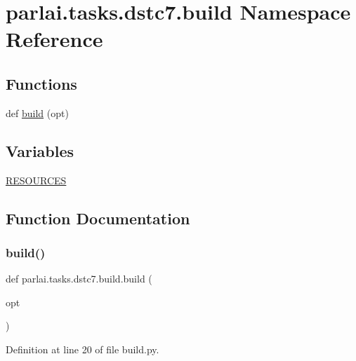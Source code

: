 \hypertarget{namespaceparlai_1_1tasks_1_1dstc7_1_1build}{}\section{parlai.\+tasks.\+dstc7.\+build Namespace Reference}
\label{namespaceparlai_1_1tasks_1_1dstc7_1_1build}
\subsection*{Functions}
\begin{DoxyCompactItemize}
\item 
def \hyperlink{namespaceparlai_1_1tasks_1_1dstc7_1_1build_a98e07e2cecdc25019b4d5eea7ea56e49}{build} (opt)
\end{DoxyCompactItemize}
\subsection*{Variables}
\begin{DoxyCompactItemize}
\item 
\hyperlink{namespaceparlai_1_1tasks_1_1dstc7_1_1build_aaab4c54d6e03048f9b7a10ad31263413}{R\+E\+S\+O\+U\+R\+C\+ES}
\end{DoxyCompactItemize}


\subsection{Function Documentation}
\mbox{\label{namespaceparlai_1_1tasks_1_1dstc7_1_1build_a98e07e2cecdc25019b4d5eea7ea56e49}} 
\subsubsection{\texorpdfstring{build()}{build()}}
{\footnotesize\ttfamily def parlai.\+tasks.\+dstc7.\+build.\+build (\begin{DoxyParamCaption}\item[{}]{opt }\end{DoxyParamCaption})}



Definition at line 20 of file build.\+py.


